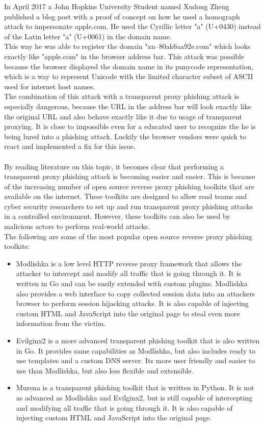 \documentclass[12pt]{report}
\begin{document}
In April 2017 a John Hopkins University Student named Xudong Zheng published a blog post with a proof of concept
on how he used a homograph attack to impersonate apple.com. He used the Cyrillic letter "a" (U+0430) instead of the
Latin letter "a" (U+0061) in the domain name.\\This way he was able to register the domain "xn--80ak6aa92e.com"
which looks exactly like "apple.com" in the browser address bar. 
This attack was possible because the browser displayed the domain name in its punycode representation, which is
a way to represent Unicode with the limited character subset of ASCII used for internet host names.\\
The combination of this attack with a transparent proxy phishing attack is especially dangerous, because
the URL in the address bar will look exactly like the original URL and also behave exactly like it due to usage of 
transparent proxying. It is close to impossible even for a educated user to recognize the he is being lured into a phishing attack.
Luckily the browser vendors were quick to react and implemented a fix for this issue.\\ \\
By reading literature on this topic, it becomes clear that performing a transparent proxy phishing attack is becoming
easier and easier. This is because of the increasing number of open source reverse proxy phishing toolkits that are
available on the internet. These toolkits are designed to allow read teams and cyber security researchers to set up and run transparent
proxy phishing attacks in a controlled environment. However, these toolkits can also be used by malicious actors to perform
real-world attacks.\\The following are some of the most popular open source reverse proxy phishing toolkits:
\begin{itemize}
  \item Modlishka \cite{modlishka} is a low level HTTP reverse proxy framework that allows the attacker to intercept and modify
    all traffic that is going through it. It is written in Go and can be easily extended with custom plugins. Modlishka also provides
    a web interface to copy collected session data into an attackers browser to perform session hijacking attacks.
    It is also capable of injecting custom HTML and JavaScript into the original page to steal even more information from the victim.

  \item Evilginx2 \cite{evilginx2} is a more advanced transparent phishing toolkit that is also written in Go. It provides same
    capabilities as Modlishka, but also includes ready to use templates and a custom DNS server. Its more user friendly and easier to use
    than Modlishka, but also less flexible and extensible.

  \item Murena \cite{murena} is a transparent phishing toolkit that is written in Python. It is not as advanced as Modlishka and Evilginx2,
    but is still capable of intercepting and modifying all traffic that is going through it. It is also capable of injecting custom HTML and
    JavaScript into the original page.
\end{itemize}
\end{document}
